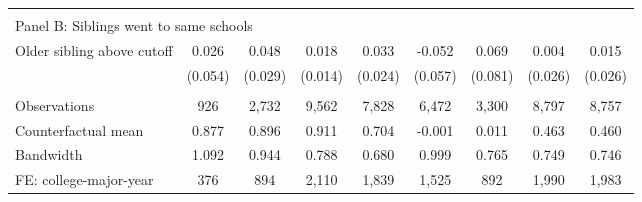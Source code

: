 {{\begin{tabular}{lcccccccc}
&  &  &  & & & & & &    \\
\multicolumn{9}{l}{Panel B: Siblings went to same schools} \\
Older sibling above cutoff&       0.026   &       0.048   &       0.018   &       0.033   &      -0.052   &       0.069   &       0.004   &       0.015   \\
                    &     (0.054)   &     (0.029)   &     (0.014)   &     (0.024)   &     (0.057)   &     (0.081)   &     (0.026)   &     (0.026)   \\
                    &               &               &               &               &               &               &               &               \\
Observations        &         926   &       2,732   &       9,562   &       7,828   &       6,472   &       3,300   &       8,797   &       8,757   \\
Counterfactual mean &       0.877   &       0.896   &       0.911   &       0.704   &      -0.001   &       0.011   &       0.463   &       0.460   \\
Bandwidth           &       1.092   &       0.944   &       0.788   &       0.680   &       0.999   &       0.765   &       0.749   &       0.746   \\
FE: college-major-year&         376   &         894   &       2,110   &       1,839   &       1,525   &         892   &       1,990   &       1,983   \\
 

\bottomrule
\end{tabular}
}
}
